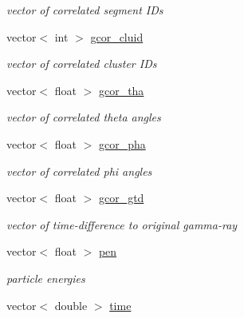 \begin{DoxyCompactItemize}
\begin{DoxyCompactList}\small\item\em vector of correlated segment I\-Ds \end{DoxyCompactList}\item 
\hypertarget{classg__clx_a93666f6d2ee0818e554d9188df02b844}{vector$<$ int $>$ \hyperlink{classg__clx_a93666f6d2ee0818e554d9188df02b844}{gcor\-\_\-cluid}}\label{classg__clx_a93666f6d2ee0818e554d9188df02b844}

\begin{DoxyCompactList}\small\item\em vector of correlated cluster I\-Ds \end{DoxyCompactList}\item 
\hypertarget{classg__clx_a19c4bfa4d9f2d4ef26399075bba0c2d2}{vector$<$ float $>$ \hyperlink{classg__clx_a19c4bfa4d9f2d4ef26399075bba0c2d2}{gcor\-\_\-tha}}\label{classg__clx_a19c4bfa4d9f2d4ef26399075bba0c2d2}

\begin{DoxyCompactList}\small\item\em vector of correlated theta angles \end{DoxyCompactList}\item 
\hypertarget{classg__clx_a823ddd84f64de88789bfa434579778dc}{vector$<$ float $>$ \hyperlink{classg__clx_a823ddd84f64de88789bfa434579778dc}{gcor\-\_\-pha}}\label{classg__clx_a823ddd84f64de88789bfa434579778dc}

\begin{DoxyCompactList}\small\item\em vector of correlated phi angles \end{DoxyCompactList}\item 
\hypertarget{classg__clx_a7a01f0832f4e7f7737179ddcc7b74b7b}{vector$<$ float $>$ \hyperlink{classg__clx_a7a01f0832f4e7f7737179ddcc7b74b7b}{gcor\-\_\-gtd}}\label{classg__clx_a7a01f0832f4e7f7737179ddcc7b74b7b}

\begin{DoxyCompactList}\small\item\em vector of time-\/difference to original gamma-\/ray \end{DoxyCompactList}\item 
\hypertarget{classg__clx_a69177d2d636c68b6e20b26b3166421a0}{vector$<$ float $>$ \hyperlink{classg__clx_a69177d2d636c68b6e20b26b3166421a0}{pen}}\label{classg__clx_a69177d2d636c68b6e20b26b3166421a0}

\begin{DoxyCompactList}\small\item\em particle energies \end{DoxyCompactList}\item 
\hypertarget{classg__clx_ad1cc659d52f0fc7616fff4d94c9ca6ea}{vector$<$ double $>$ \hyperlink{classg__clx_ad1cc659d52f0fc7616fff4d94c9ca6ea}{time}}\label{classg__clx_ad1cc659d52f0fc7616fff4d94c9ca6ea}


\end{DoxyCompactItemize}
